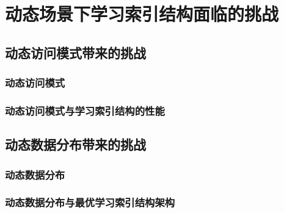 \chapter{动态场景下学习索引结构面临的挑战}
\label{chap:challenge}

\section{动态访问模式带来的挑战}

\subsection{动态访问模式}

\subsection{动态访问模式与学习索引结构的性能}

\section{动态数据分布带来的挑战}

\subsection{动态数据分布}

\subsection{动态数据分布与最优学习索引结构架构}
